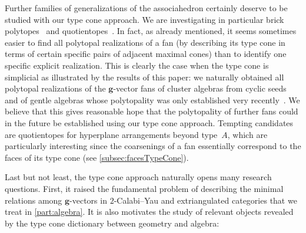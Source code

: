 \documentclass{amsart}
\theoremstyle{definition}
\renewcommand{\b}[1]{{\boldsymbol{#1}}} %
\begin{document}
\smallskip
\enlargethispage{.5cm}
Further families of generalizations of the associahedron certainly deserve to be studied with our type cone approach.
We are investigating in particular brick polytopes~\cite{PilaudSantos-brickPolytope, PilaudStump-brickPolytope} and quotientopes~\cite{Reading-latticeCongruences, Reading-CambrianLattices, PilaudSantos-quotientopes}.
In fact, as already mentioned, it seems sometimes easier to find all polytopal realizations of a fan (by describing its type cone in terms of certain specific pairs of adjacent maximal cones) than to identify one specific explicit realization.
This is clearly the case when the type cone is simplicial as illustrated by the results of this paper: we naturally obtained all polytopal realizations of the $\b{g}$-vector fans of cluster algebras from cyclic seeds and of gentle algebras whose polytopality was only established very recently~\cite{HohlwegPilaudStella, PaluPilaudPlamondon-nonkissing}.
We believe that this gives reasonable hope that the polytopality of further fans could in the future be established using our type cone approach.
Tempting candidates are quotientopes for hyperplane arrangements beyond type~$A$, which are particularly interesting since the coarsenings of a fan essentially correspond to the faces of its type cone (see \cref{subsec:facesTypeCone}).

\medskip
Last but not least, the type cone approach naturally opens many research questions.
First, it raised the fundamental problem of describing the minimal relations among $\b{g}$-vectors in $2$-Calabi--Yau and extriangulated categories that we treat in \cref{part:algebra}.
It is also motivates the study of relevant objects revealed by the type cone dictionary between geometry and algebra:
\end{document}
